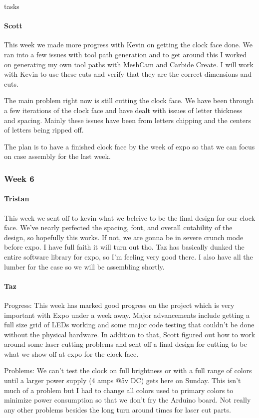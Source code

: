 tasks\documentclass[onecolumn, draftclsnofoot,10pt, compsoc]{IEEEtran}
\begin{document}
\paragraph{Scott}
This week we made more progress with Kevin on getting the clock face done. We ran into a few issues with tool path generation and to get around this I worked on generating my own tool paths with MeshCam and Carbide Create. I will work with Kevin to use these cuts and verify that they are the correct dimensions and cuts.

The main problem right now is still cutting the clock face. We have been through a few iterations of the clock face and have dealt with issues of letter thickness and spacing. Mainly these issues have been from letters chipping and the centers of letters being ripped off.

The plan is to have a finished clock face by the week of expo so that we can focus on case assembly for the last week.
\subsubsection{Week 6}
\paragraph{Tristan}
This week we sent off to kevin what we beleive to be the final design for our clock face. We've nearly perfected the spacing, font, and overall cutability of the design, so hopefully this works. If not, we are gonna be in severe crunch mode before expo. I have full faith it will turn out tho. Taz has basically dunked the entire software library for expo, so I'm feeling very good there. I also have all the lumber for the case so we will be assembling shortly.

\paragraph{Taz}
Progress: This week has marked good progress on the project which is very important with Expo under a week away. Major advancements include getting a full size grid of LEDs working and some major code testing that couldn't be done without the physical hardware. In addition to that, Scott figured out how to work around some laser cutting problems and sent off a final design for cutting to be what we show off at expo for the clock face.

Problems: We can't test the clock on full brightness or with a full range of colors until a larger power supply (4 amps @5v DC) gets here on Sunday. This isn't much of a problem but I had to change all colors used to primary colors to minimize power consumption so that we don't fry the Arduino board. Not really any other problems besides the long turn around times for laser cut parts.
\end{document}
